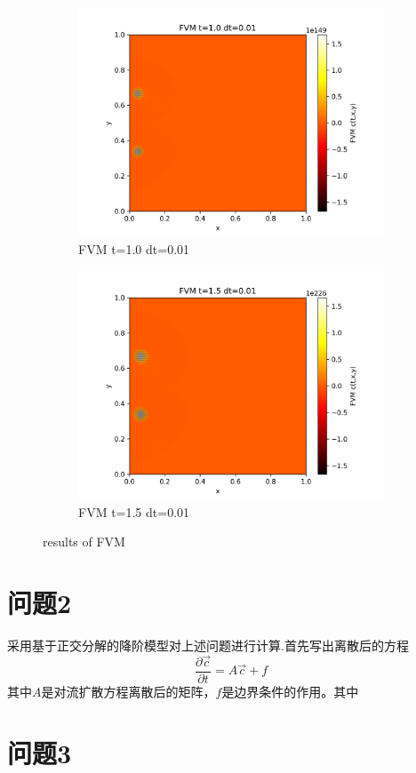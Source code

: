 \documentclass[11pt,a4 paper,one side]{article}
\begin{document}
\begin{figure}[htbp]
    \begin{subfigure}{0.45\textwidth}
        \includegraphics[width=\textwidth]{FVM t=1.0 dt=0.01.png}
        \caption{FVM t=1.0 dt=0.01}
        \label{FVM t=1.0 dt=0.01}
    \end{subfigure}
    \hfill
    \begin{subfigure}{0.45\textwidth}
        \includegraphics[width=\textwidth]{FVM t=1.5 dt=0.01.png}
        \caption{FVM t=1.5 dt=0.01}
        \label{FVM t=1.5 dt=0.01}
    \end{subfigure}
    \caption{results of FVM}
    \label{results of FVM}
\end{figure}

\section{问题2}
采用基于正交分解的降阶模型对上述问题进行计算.首先写出离散后的方程\begin{equation}
    \frac{\partial \vec{c}}{\partial t} = A\vec{c}+f
\end{equation}
其中$A$是对流扩散方程离散后的矩阵，$f$是边界条件的作用。其中
\section{问题3}
\end{document}

